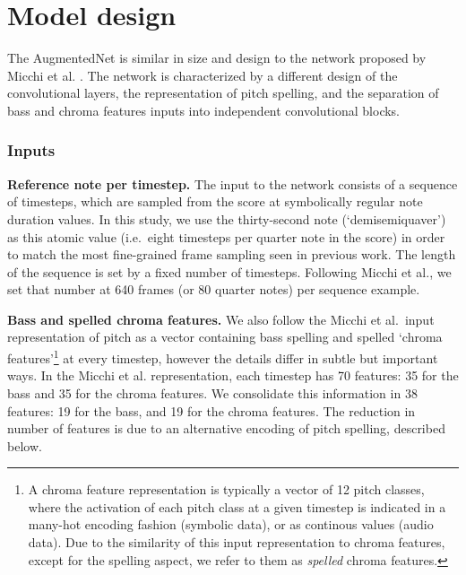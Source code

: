 \chapter{Model design}
\label{chap:chap4}


The AugmentedNet is similar in size and design to the network proposed by Micchi et al. \cite{micchi_not_2020}. The network is characterized by a different design of the convolutional layers, the representation of pitch spelling, and the separation of bass and chroma features inputs into independent convolutional blocks.

\subsection{Inputs}

\textbf{Reference note per timestep.}
The input to the network consists of a sequence of timesteps, which are sampled from the score at symbolically regular note duration values.
In this study, we use the thirty-second note (`demisemiquaver') as this atomic value (i.e.~eight timesteps per quarter note in the score) in order to match the most fine-grained frame sampling seen in previous work. The length of the sequence is set by a fixed number of timesteps. Following Micchi et al., we set that number at 640 frames (or 80 quarter notes) per sequence example.

\textbf{Bass and spelled chroma features.}
We also follow the Micchi et al.~input representation of pitch as a vector containing bass spelling and spelled `chroma features'\footnote{A chroma feature representation is typically a vector of 12 pitch classes, where the activation of each pitch class at a given timestep is indicated in a many-hot encoding fashion (symbolic data), or as continous values (audio data). 
Due to the similarity of this input representation to chroma features, except for the spelling aspect, we refer to them as \emph{spelled} chroma features.} at every timestep, however the details differ in subtle but important ways. 
In the Micchi et al. representation, each timestep has 70 features: 35 for the bass and 35 for the chroma features. 
We consolidate this information in 38 features: 19 for the bass, and 19 for the chroma features. The reduction in number of features is due to an alternative encoding of pitch spelling, described below.

